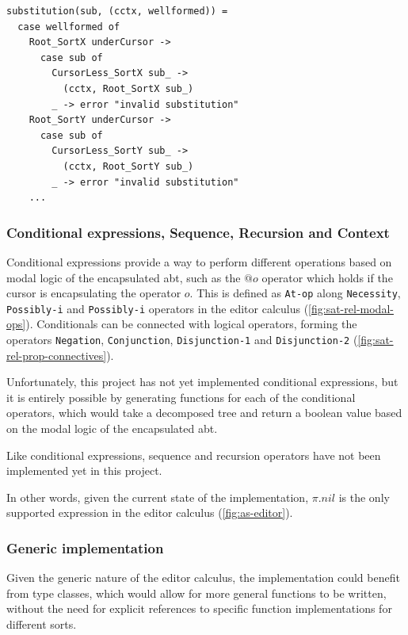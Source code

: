 \begin{lstlisting}[style=inline,caption={Pseudocode for substitution operator},label={lst:substitution-pseudocode}]
substitution(sub, (cctx, wellformed)) =
  case wellformed of
    Root_SortX underCursor ->
      case sub of
        CursorLess_SortX sub_ ->
          (cctx, Root_SortX sub_)
        _ -> error "invalid substitution"
    Root_SortY underCursor ->
      case sub of
        CursorLess_SortY sub_ ->
          (cctx, Root_SortY sub_)
        _ -> error "invalid substitution"
    ...
\end{lstlisting}

\subsubsection{Conditional expressions, Sequence, Recursion and Context}

Conditional expressions provide a way to perform different operations based on
modal logic of the encapsulated abt, such as the $@o$ operator which holds
if the cursor is encapsulating the operator $o$. This is defined as \texttt{At-op}
along \texttt{Necessity}, \texttt{Possibly-i} and \texttt{Possibly-i} operators
in the editor calculus\cite{aalborg} (\cref{fig:sat-rel-modal-ops}). Conditionals
can be connected with logical operators, forming the operators \texttt{Negation},
\texttt{Conjunction}, \texttt{Disjunction-1} and \texttt{Disjunction-2}
(\cref{fig:sat-rel-prop-connectives}).

Unfortunately, this project has not yet implemented conditional expressions,
but it is entirely possible by generating functions for each of the
conditional operators, which would take a decomposed tree and return a boolean
value based on the modal logic of the encapsulated abt.

Like conditional expressions, sequence and recursion operators
have not been implemented yet in this project.

In other words, given the current state of the implementation, $\pi.nil$ is the only supported expression in the editor calculus (\cref{fig:as-editor}).

\subsubsection{Generic implementation}
Given the generic nature of the editor calculus, the implementation could
benefit from type classes, which would allow for more general functions
to be written, without the need for explicit references to specific
function implementations for different sorts.

